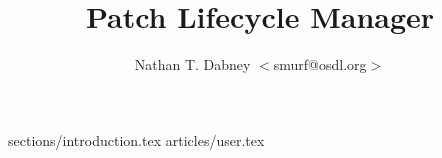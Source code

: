 \documentclass [twoside,12pt] {article}
\begin{document}
\title {Patch Lifecycle Manager}
\author {Nathan T. Dabney $<$smurf@osdl.org$>$}

\maketitle 
\tableofcontents

 {sections/introduction.tex}
 {articles/user.tex}

\printindex
\end{document}
